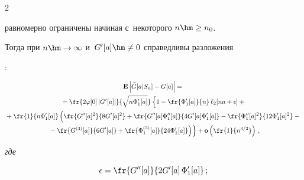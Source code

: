 \begin{multicols}{2}
{  равномерно ограничены   начиная с~некоторого $n\hm\ge n_0$.


  Тогда при $n \hm\to \infty$ и~$G'[a]\hm\neq 0$ справедливы разложения}:


  


\noindent


   \begin{multline}


\mathbf{E} \left|\widehat{G}[a|S_n]-G[a]\right|={}\\


{}=


  \fr{2\varphi[0]\left|G'[a]\right|}{\sqrt{n\Phi_1 '[a]}}


   \left\{


   \vphantom{\fr{G^{(3)}[a]}{6 G'[a]}


  +\fr{\Phi_1^{(3)}[a]}{24 \Phi_1'[a]}}


   1-\fr{\Phi_1 '[a]}{n}\,\ell_2[na+\epsilon]


  +{}\right.


\\


{}  +\fr{1}{n\Phi_1'[a]}\left(


\vphantom{\fr{G^{(3)}[a]}{6 G'[a]}


  +\fr{\Phi_1^{(3)}[a]}{24 \Phi_1'[a]}}


  \fr{G''[a]^2}{8 G'[a]^2}


  +\fr{G''[a] \Phi_1''[a]}{4 G'[a] \Phi_1'[a]}


  -\fr{\Phi_1''[a]^2}{12\Phi_1'[a]^2}-{}\right.\\


\left.\left.  {}  -\fr{G^{(3)}[a]}{6 G'[a]}


  +\fr{\Phi_1^{(3)}[a]}{24 \Phi_1'[a]}\right)\right\}+


  \mathbf{o}\left(\fr{1}{n^{3/2}}\right)\,,


\label{e3-ch}


  \end{multline}


  


 \noindent


\textit{где}


$$


\epsilon=\fr{G''[a]}{2G'[a]\,\Phi_1 '[a]}\,;


$$





\vspace*{-12pt}






\end{multicols}
